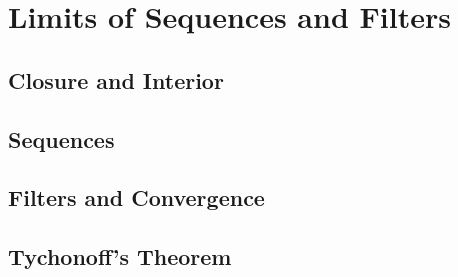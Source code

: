 \chapter{Limits of Sequences and Filters}

\section{Closure and Interior}



\section{Sequences}










\section{Filters and Convergence}












\section{Tychonoff’s Theorem}








